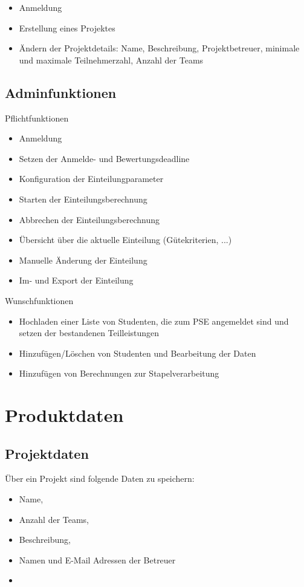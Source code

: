 \documentclass[parskip=full]{scrartcl}
\begin{document}
\begin{itemize}
  \item Anmeldung
  \item Erstellung eines Projektes
  \item Ändern der Projektdetails: Name, Beschreibung, Projektbetreuer, minimale und maximale Teilnehmerzahl, Anzahl der Teams
\end{itemize}

\subsection{Adminfunktionen}

Pflichtfunktionen

\begin{itemize}
  \item Anmeldung
  \item Setzen der Anmelde- und Bewertungsdeadline
  \item Konfiguration der Einteilungparameter
  \item Starten der Einteilungsberechnung
  \item Abbrechen der Einteilungsberechnung
  \item Übersicht über die aktuelle Einteilung (Gütekriterien, ...)
  \item Manuelle Änderung der Einteilung
  \item Im- und Export der Einteilung
\end{itemize}

Wunschfunktionen

\begin{itemize}
  \item Hochladen einer Liste von Studenten, die zum PSE angemeldet sind und setzen der bestandenen Teilleistungen
  \item Hinzufügen/Löschen von Studenten und Bearbeitung der Daten
  \item Hinzufügen von Berechnungen zur Stapelverarbeitung
\end{itemize}

\section{Produktdaten}

\subsection{Projektdaten} 
Über ein Projekt sind folgende Daten zu speichern:
\begin{itemize} 
  \item Name,
  \item Anzahl der Teams,
  \item Beschreibung,
  \item Namen und E-Mail Adressen der Betreuer
  \item 
\end{itemize}
\end{document}
